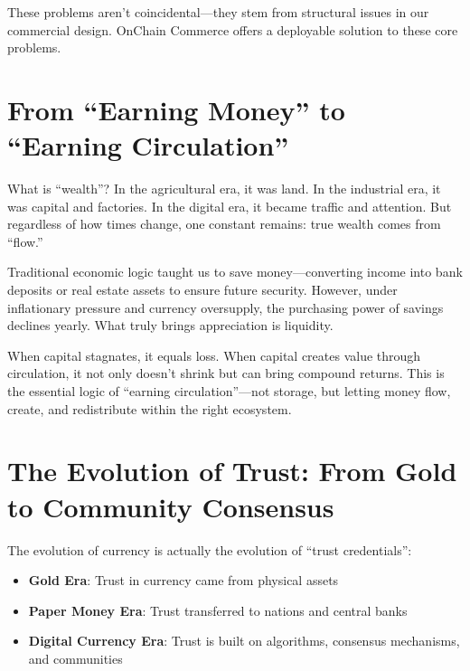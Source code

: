 \documentclass[
  Letterpaper,
]{scrbook}
\providecommand{\tightlist}{%
  \setlength{\itemsep}{0pt}\setlength{\parskip}{0pt}}
\begin{document}
These problems aren't coincidental---they stem from structural issues in
our commercial design. OnChain Commerce offers a deployable solution to
these core problems.

\section*{From ``Earning Money'' to ``Earning
Circulation''}\label{from-earning-money-to-earning-circulation}


What is ``wealth''? In the agricultural era, it was land. In the
industrial era, it was capital and factories. In the digital era, it
became traffic and attention. But regardless of how times change, one
constant remains: true wealth comes from ``flow.''

Traditional economic logic taught us to save money---converting income
into bank deposits or real estate assets to ensure future security.
However, under inflationary pressure and currency oversupply, the
purchasing power of savings declines yearly. What truly brings
appreciation is liquidity.

When capital stagnates, it equals loss. When capital creates value
through circulation, it not only doesn't shrink but can bring compound
returns. This is the essential logic of ``earning circulation''---not
storage, but letting money flow, create, and redistribute within the
right ecosystem.

\section*{The Evolution of Trust: From Gold to Community
Consensus}\label{the-evolution-of-trust-from-gold-to-community-consensus}


The evolution of currency is actually the evolution of ``trust
credentials'':

\begin{itemize}
\tightlist
\item
  \textbf{Gold Era}: Trust in currency came from physical assets
\item
  \textbf{Paper Money Era}: Trust transferred to nations and central
  banks\\
\item
  \textbf{Digital Currency Era}: Trust is built on algorithms, consensus
  mechanisms, and communities
\end{itemize}
\end{document}

